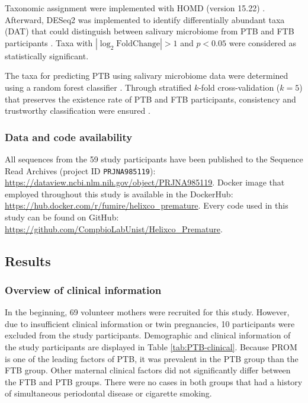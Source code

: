 \documentclass[11pt, a4paper, onecolumn, oneside]{report}
\begin{document}
                Taxonomic assignment were implemented with HOMD (version 15.22) \cite{HOMD-1}. Afterward, DESeq2 was implemented to identify differentially abundant taxa (DAT) that could distinguish between salivary microbiome from PTB and FTB participants \cite{DESeq2-1}. Taxa with $| \log _2 \textrm{FoldChange} | > 1$ and $p < 0.05$ were considered as statistically significant.

                The taxa for predicting PTB using salivary microbiome data were determined using a random forest classifier \cite{RF-1}. Through stratified $k$-fold cross-validation ($k=5$) that preserves the existence rate of PTB and FTB participants, consistency and trustworthy classification were ensured \cite{Kfold-1}.

            \subsubsection{Data and code availability}
                All sequences from the 59 study participants have been published to the Sequence Read Archives (project ID \texttt{PRJNA985119}): \url{https://dataview.ncbi.nlm.nih.gov/object/PRJNA985119}. Docker image that employed throughout this study is available in the DockerHub: \url{https://hub.docker.com/r/fumire/helixco_premature}. Every code used in this study can be found on GitHub: \url{https://github.com/CompbioLabUnist/Helixco_Premature}.
        \newpage

        \subsection{Results}
            \subsubsection{Overview of clinical information}
                In the beginning, 69 volunteer mothers were recruited for this study. However, due to insufficient clinical information or twin pregnancies, 10 participants were excluded from the study participants. Demographic and clinical information of the study participants are displayed in Table \ref{tab:PTB-clinical}. Because PROM is one of the leading factors of PTB, it was prevalent in the PTB group than the FTB group. Other maternal clinical factors did not significantly differ between the FTB and PTB groups. There were no cases in both groups that had a history of simultaneous periodontal disease or cigarette smoking.
\end{document}

